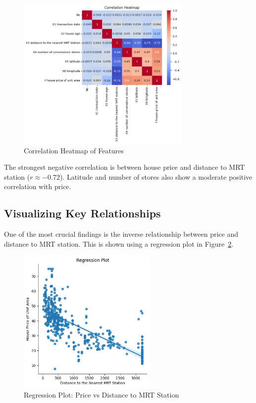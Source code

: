 \documentclass[12pt]{article}
\begin{document}
\begin{figure}[H]
    \centering
    \includegraphics[width=0.75\textwidth]{correlation_heatmap.png}
    \caption{Correlation Heatmap of Features}
    \label{fig:corr}
\end{figure}

The strongest negative correlation is between house price and distance to MRT station ($r \approx -0.72$). Latitude and number of stores also show a moderate positive correlation with price.

\subsection{Visualizing Key Relationships}
One of the most crucial findings is the inverse relationship between price and distance to MRT station. This is shown using a regression plot in Figure~\ref{fig:reg}.

\begin{figure}[H]
    \centering
    \includegraphics[width=0.6\textwidth]{regression_plot.png}
    \caption{Regression Plot: Price vs Distance to MRT Station}
    \label{fig:reg}
\end{figure}
\end{document}
